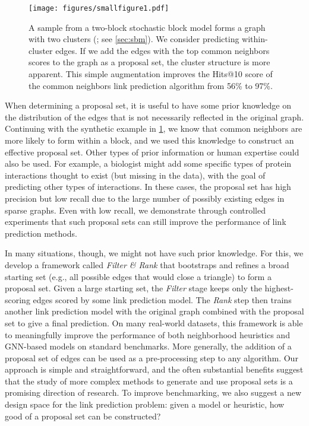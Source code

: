 \documentclass{article}
\begin{document}
\begin{figure}[t]
    \centering
    \texttt{[image: figures/smallfigure1.pdf]}
    \vspace{-0.5\baselineskip}
    \caption{\label{fig:block} A sample from a two-block stochastic block model forms a graph with two clusters
    (; see \cref{sec:sbm}).
    We consider predicting within-cluster edges.
    If we add the edges with the top common neighbors scores to the graph as a proposal set, the cluster structure is more apparent.
    This simple augmentation improves the Hits@10 score of the common neighbors link prediction algorithm 
    from 56\% to 97\%.
    }
\end{figure}

When determining a proposal set, it is useful to have some prior knowledge on the distribution of the edges that is not necessarily reflected in the original graph.
Continuing with the synthetic example in \cref{fig:block}, we know that common neighbors are more likely to form within a block, and we used this knowledge to construct an effective proposal set.
Other types of prior information or human expertise could also be used.
For example, a biologist might add some specific types of protein interactions thought to exist (but missing in the data),
with the goal of predicting other types of interactions.
In these cases, the proposal set has high precision but low recall due to the large number of possibly existing edges in sparse graphs. 
Even with low recall, we demonstrate through controlled experiments that such proposal sets can still improve the performance of link prediction methods.

In many situations, though, we might not have such prior knowledge.
For this, we develop a framework called \emph{Filter \& Rank} that 
bootstraps and refines a broad starting set (e.g., all possible edges that would close a triangle) to form a proposal set.
Given a large starting set, the \emph{Filter} stage keeps only the  highest-scoring edges scored by some link prediction model.
The \emph{Rank} step then trains another link prediction model with the original graph combined with the proposal set to give a final prediction.
On many real-world datasets, this framework is able to meaningfully improve the performance of both neighborhood heuristics and GNN-based models on standard benchmarks.
More generally, the addition of a proposal set of edges can be used as a pre-processing step to any algorithm. 
Our approach is simple and straightforward, and the often substantial benefits suggest that
the study of more complex methods to generate and use proposal sets is a promising direction of research.
To improve benchmarking, we also suggest a new design space for the link prediction problem: 
given a model or heuristic, how good of a proposal set can be constructed? 
\end{document}
